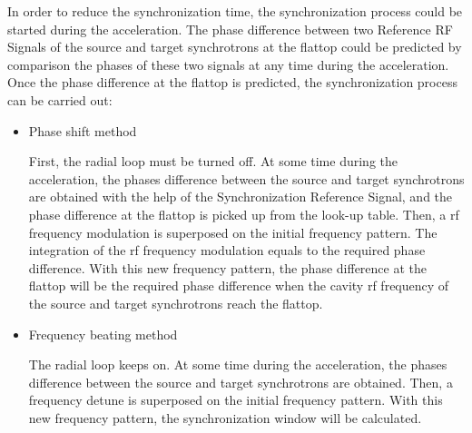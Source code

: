 In order to reduce the synchronization time, the synchronization process could be started during the acceleration. The phase
difference between two Reference RF Signals of the source and target synchrotrons at the flattop could be predicted by comparison the phases of these two signals at any time during the acceleration. Once the phase difference at the flattop is predicted, the synchronization process can be carried out: 
\begin{itemize}
	\item Phase shift method

First, the radial loop must be turned off. At some time during the acceleration, the phases difference between the source and target synchrotrons are obtained with the help of the Synchronization Reference Signal, and the phase difference at the flattop is picked up from the look-up table. Then, a rf frequency modulation is superposed on the initial frequency pattern. The integration of the rf frequency modulation equals to the required phase difference. With this new frequency pattern, the phase difference at the flattop will be the required phase difference when the cavity rf frequency of the source and target synchrotrons reach the flattop. 
	\item Frequency beating method

The radial loop keeps on. At some time during the acceleration, the phases difference between the source and target synchrotrons are obtained. Then, a frequency detune is superposed on the initial frequency pattern. With this new frequency pattern, the synchronization window will be calculated. 
\end{itemize}